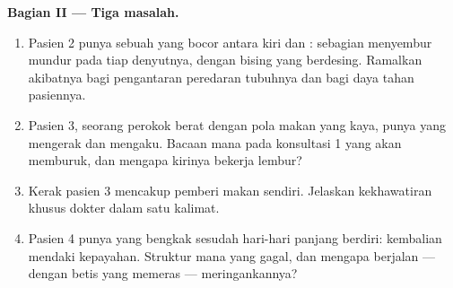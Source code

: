 \begin{problem}
\medskip\noindent\textbf{Bagian II --- Tiga masalah.}
\begin{enumerate}[resume]
  \item Pasien 2 punya sebuah  yang bocor antara  kiri dan
        : sebagian  menyembur mundur pada tiap
        denyutnya, dengan bising  yang berdesing. Ramalkan
        akibatnya bagi pengantaran peredaran tubuhnya dan bagi daya
        tahan pasiennya.
  \item Pasien 3, seorang perokok berat dengan pola makan yang kaya,
        punya  yang mengerak dan mengaku. Bacaan mana pada
        konsultasi 1 yang akan memburuk, dan mengapa  kirinya
        bekerja lembur?
  \item Kerak pasien 3 mencakup  pemberi makan 
        sendiri. Jelaskan kekhawatiran khusus dokter  dalam
        satu kalimat.
  \item Pasien 4 punya  yang bengkak sesudah hari-hari
        panjang berdiri: kembalian mendaki  kepayahan. Struktur
        mana yang gagal, dan mengapa berjalan --- dengan  betis
        yang memeras  --- meringankannya?
\end{enumerate}


\end{problem}
